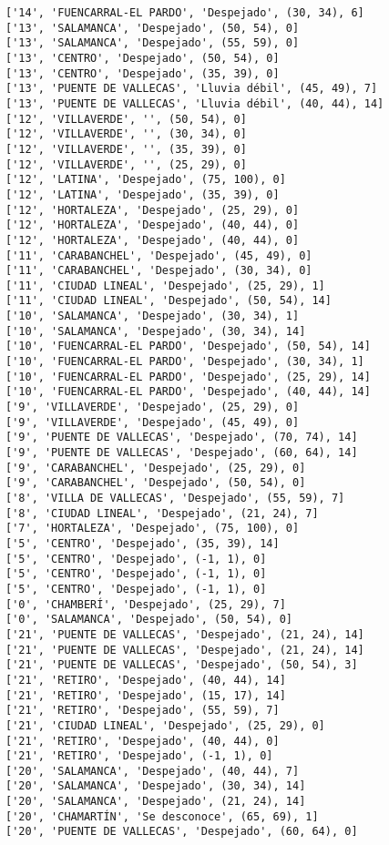\documentclass[11pt]{article}
\begin{document}
\begin{Verbatim}[commandchars=\\\{\}]
['14', 'FUENCARRAL-EL PARDO', 'Despejado', (30, 34), 6]
['13', 'SALAMANCA', 'Despejado', (50, 54), 0]
['13', 'SALAMANCA', 'Despejado', (55, 59), 0]
['13', 'CENTRO', 'Despejado', (50, 54), 0]
['13', 'CENTRO', 'Despejado', (35, 39), 0]
['13', 'PUENTE DE VALLECAS', 'Lluvia débil', (45, 49), 7]
['13', 'PUENTE DE VALLECAS', 'Lluvia débil', (40, 44), 14]
['12', 'VILLAVERDE', '', (50, 54), 0]
['12', 'VILLAVERDE', '', (30, 34), 0]
['12', 'VILLAVERDE', '', (35, 39), 0]
['12', 'VILLAVERDE', '', (25, 29), 0]
['12', 'LATINA', 'Despejado', (75, 100), 0]
['12', 'LATINA', 'Despejado', (35, 39), 0]
['12', 'HORTALEZA', 'Despejado', (25, 29), 0]
['12', 'HORTALEZA', 'Despejado', (40, 44), 0]
['12', 'HORTALEZA', 'Despejado', (40, 44), 0]
['11', 'CARABANCHEL', 'Despejado', (45, 49), 0]
['11', 'CARABANCHEL', 'Despejado', (30, 34), 0]
['11', 'CIUDAD LINEAL', 'Despejado', (25, 29), 1]
['11', 'CIUDAD LINEAL', 'Despejado', (50, 54), 14]
['10', 'SALAMANCA', 'Despejado', (30, 34), 1]
['10', 'SALAMANCA', 'Despejado', (30, 34), 14]
['10', 'FUENCARRAL-EL PARDO', 'Despejado', (50, 54), 14]
['10', 'FUENCARRAL-EL PARDO', 'Despejado', (30, 34), 1]
['10', 'FUENCARRAL-EL PARDO', 'Despejado', (25, 29), 14]
['10', 'FUENCARRAL-EL PARDO', 'Despejado', (40, 44), 14]
['9', 'VILLAVERDE', 'Despejado', (25, 29), 0]
['9', 'VILLAVERDE', 'Despejado', (45, 49), 0]
['9', 'PUENTE DE VALLECAS', 'Despejado', (70, 74), 14]
['9', 'PUENTE DE VALLECAS', 'Despejado', (60, 64), 14]
['9', 'CARABANCHEL', 'Despejado', (25, 29), 0]
['9', 'CARABANCHEL', 'Despejado', (50, 54), 0]
['8', 'VILLA DE VALLECAS', 'Despejado', (55, 59), 7]
['8', 'CIUDAD LINEAL', 'Despejado', (21, 24), 7]
['7', 'HORTALEZA', 'Despejado', (75, 100), 0]
['5', 'CENTRO', 'Despejado', (35, 39), 14]
['5', 'CENTRO', 'Despejado', (-1, 1), 0]
['5', 'CENTRO', 'Despejado', (-1, 1), 0]
['5', 'CENTRO', 'Despejado', (-1, 1), 0]
['0', 'CHAMBERÍ', 'Despejado', (25, 29), 7]
['0', 'SALAMANCA', 'Despejado', (50, 54), 0]
['21', 'PUENTE DE VALLECAS', 'Despejado', (21, 24), 14]
['21', 'PUENTE DE VALLECAS', 'Despejado', (21, 24), 14]
['21', 'PUENTE DE VALLECAS', 'Despejado', (50, 54), 3]
['21', 'RETIRO', 'Despejado', (40, 44), 14]
['21', 'RETIRO', 'Despejado', (15, 17), 14]
['21', 'RETIRO', 'Despejado', (55, 59), 7]
['21', 'CIUDAD LINEAL', 'Despejado', (25, 29), 0]
['21', 'RETIRO', 'Despejado', (40, 44), 0]
['21', 'RETIRO', 'Despejado', (-1, 1), 0]
['20', 'SALAMANCA', 'Despejado', (40, 44), 7]
['20', 'SALAMANCA', 'Despejado', (30, 34), 14]
['20', 'SALAMANCA', 'Despejado', (21, 24), 14]
['20', 'CHAMARTÍN', 'Se desconoce', (65, 69), 1]
['20', 'PUENTE DE VALLECAS', 'Despejado', (60, 64), 0]

\end{Verbatim}
\end{document}
